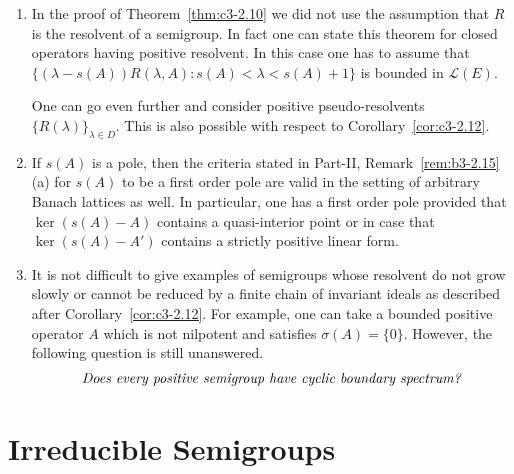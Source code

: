 \begin{remarks}\label{rem:c3-2.15}
\begin{enumerate}[\upshape (i), wide, labelindent=.25em]	
	\item 
	In the proof of Theorem~\ref{thm:c3-2.10} we did not use the assumption that $R$ is the resolvent of a semigroup.
	In fact one can state this theorem for closed operators having positive resolvent.
	In this case one has to assume that  
    $\{(\lambda-s(A))R(\lambda,A) : s(A) < \lambda < s(A)+1\}$
    is bounded in $\mathcal{L}(E)$.
	
	One can go even further and consider positive pseudo-resolvents 
    $\{R(\lambda)\}_{\lambda\in D}$.
	This is also possible with respect to Corollary~\ref{cor:c3-2.12}.
	
	\item 
	If\/ $s(A)$ is a pole, then the criteria stated in Part-II, Remark~\ref{rem:b3-2.15}\,(a) for $s(A)$ to be a first order pole are valid in the setting of arbitrary Banach lattices as well.
	In particular, one has a first order pole provided that $\ker(s(A) - A)$ contains a quasi-interior point or in case that $\ker(s(A) - A')$ contains a strictly positive linear form.
	
	\item 
	It is not difficult to give examples of semigroups whose resolvent do not grow slowly or cannot be reduced by a finite chain of invariant ideals as described after Corollary~\ref{cor:c3-2.12}.
	For example, one can take a bounded positive operator $A$ which is not nilpotent and satisfies $\sigma(A) = \{0\}$.
	However, the following question is still unanswered.
	\begin{equation*}
		\textit{Does every positive semigroup have cyclic boundary spectrum?}\index{boundary spectrum!cyclic}
	\end{equation*}
\end{enumerate}
\end{remarks}
\section{Irreducible Semigroups}\label{sec:c3-3}

